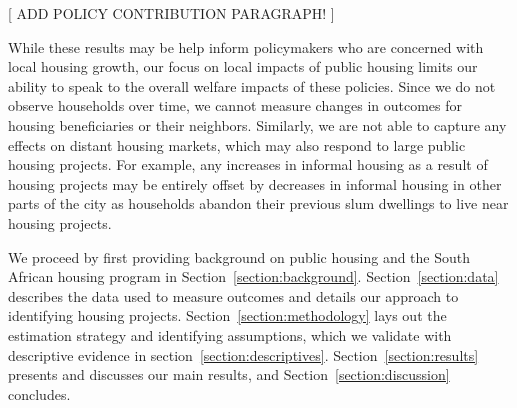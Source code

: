 \documentclass[12pt]{article}
\begin{document}
[ ADD POLICY CONTRIBUTION PARAGRAPH! ]
 

While these results may be help inform policymakers who are concerned with local housing growth, our focus on local impacts of public housing limits our ability to speak to the overall welfare impacts of these policies.  Since we do not observe  households over time, we cannot measure changes in outcomes for housing beneficiaries or their neighbors.  Similarly, we are not able to capture any effects on distant housing markets, which may also respond to large public housing projects.  For example, any increases in informal housing as a result of housing projects may be entirely offset by decreases in informal housing in other parts of the city as households abandon their previous slum dwellings to live near housing projects.


We proceed by first providing background on public housing and the South African housing program in Section~\ref{section:background}. 
Section~\ref{section:data} describes the data used to measure outcomes and details our approach to identifying housing projects. Section~\ref{section:methodology} lays out the estimation strategy and identifying assumptions, which we validate with descriptive evidence in section~\ref{section:descriptives}. Section~\ref{section:results} presents and discusses our main results, and  Section~\ref{section:discussion} concludes.




\end{document}
